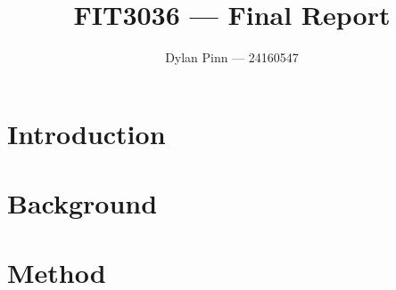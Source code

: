 \documentclass[a4paper,11pt]{article}
\begin{document}
\title{FIT3036 --- Final Report}
\author{Dylan Pinn --- 24160547}
\maketitle
\pagebreak

\tableofcontents
\pagebreak

\section{Introduction}

\section{Background}

\section{Method}
\end{document}
